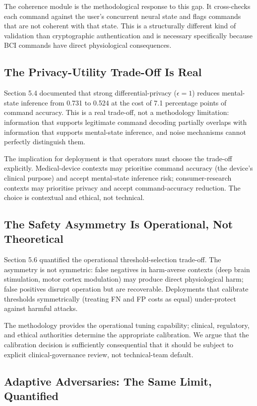 \documentclass[sigconf,nonacm]{acmart}
\begin{document}
The coherence module is the methodological response to this gap.
It cross-checks each command against the user's concurrent neural
state and flags commands that are not coherent with that state.
This is a structurally different kind of validation than
cryptographic authentication and is necessary specifically because
BCI commands have direct physiological consequences.

\subsection{The Privacy-Utility Trade-Off Is Real}

Section 5.4 documented that strong differential-privacy
($\epsilon = 1$) reduces mental-state inference from 0.731 to
0.524 at the cost of 7.1 percentage points of command accuracy.
This is a real trade-off, not a methodology limitation: information
that supports legitimate command decoding partially overlaps with
information that supports mental-state inference, and noise
mechanisms cannot perfectly distinguish them.

The implication for deployment is that operators must choose the
trade-off explicitly. Medical-device contexts may prioritise
command accuracy (the device's clinical purpose) and accept
mental-state inference risk; consumer-research contexts may
prioritise privacy and accept command-accuracy reduction. The
choice is contextual and ethical, not technical.

\subsection{The Safety Asymmetry Is Operational, Not Theoretical}

Section 5.6 quantified the operational threshold-selection
trade-off. The asymmetry is not symmetric: false negatives in
harm-averse contexts (deep brain stimulation, motor cortex
modulation) may produce direct physiological harm; false positives
disrupt operation but are recoverable. Deployments that calibrate
thresholds symmetrically (treating FN and FP costs as equal)
under-protect against harmful attacks.

The methodology provides the operational tuning capability;
clinical, regulatory, and ethical authorities determine the
appropriate calibration. We argue that the calibration decision
is sufficiently consequential that it should be subject to
explicit clinical-governance review, not technical-team default.

\subsection{Adaptive Adversaries: The Same Limit, Quantified}
\end{document}
